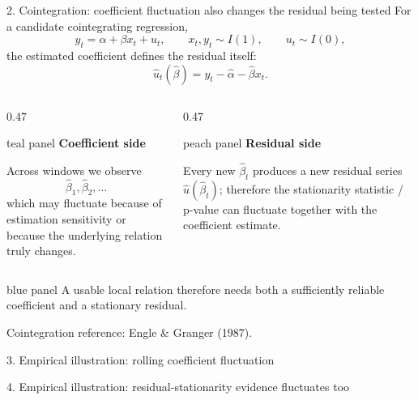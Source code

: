 \documentclass[aspectratio=169,10pt]{beamer}
\newenvironment{tealpanel}{\begin{beamercolorbox}[wd=\linewidth,sep=0.16cm,rounded=true]{teal panel}}{\end{beamercolorbox}}
\newenvironment{peachpanel}{\begin{beamercolorbox}[wd=\linewidth,sep=0.16cm,rounded=true]{peach panel}}{\end{beamercolorbox}}
\newenvironment{bluepanel}{\begin{beamercolorbox}[wd=\linewidth,sep=0.16cm,rounded=true]{blue panel}}{\end{beamercolorbox}}
\newcommand{\plotblank}[2][]{%
  \vspace{0.06cm}
  {\color{linegray}\setlength{\fboxsep}{0pt}\setlength{\fboxrule}{0.45pt}%
  \fbox{\parbox[c][#2][c]{0.985\linewidth}{\centering\color{linegray}\scriptsize #1}}}%
}
\begin{document}
\begin{frame}{2. Cointegration: coefficient fluctuation also changes the residual being tested}
\small
For a candidate cointegrating regression,
\[
 y_t=\alpha+\beta x_t+u_t,\qquad x_t,y_t\sim I(1),\qquad u_t\sim I(0),
\]
the estimated coefficient defines the residual itself:
\[
\boxed{\hat u_t(\hat\beta)=y_t-\hat\alpha-\hat\beta x_t.}
\]

\begin{columns}[T,onlytextwidth]
\begin{column}{0.47\textwidth}
\begin{tealpanel}
\textbf{Coefficient side}

Across windows we observe
\[
\hat\beta_1,\hat\beta_2,\ldots
\]
which may fluctuate because of estimation sensitivity or because the underlying relation truly changes.
\end{tealpanel}
\end{column}
\begin{column}{0.47\textwidth}
\begin{peachpanel}
\textbf{Residual side}

Every new $\hat\beta_t$ produces a new residual series $\hat u(\hat\beta_t)$; therefore the stationarity statistic / p-value can fluctuate together with the coefficient estimate.
\end{peachpanel}
\end{column}
\end{columns}

\vspace{0.11cm}
\begin{bluepanel}
\centering
A usable local relation therefore needs both a sufficiently reliable coefficient and a stationary residual.
\end{bluepanel}
\vspace{0.04cm}
{\color{textgray}\fontsize{5.2}{5.8}\selectfont Cointegration reference: Engle \& Granger (1987).}
\end{frame}

\begin{frame}{3. Empirical illustration: rolling coefficient fluctuation}
\vspace{0.28cm}
\plotblank[]{5.65cm}
\end{frame}

\begin{frame}{4. Empirical illustration: residual-stationarity evidence fluctuates too}
\vspace{0.28cm}
\plotblank[]{5.65cm}
\end{frame}
\end{document}

